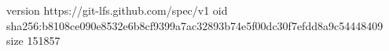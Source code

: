 version https://git-lfs.github.com/spec/v1
oid sha256:b8108ce090e8532e6b8cf9399a7ac32893b74e5f00dc30f7efdd8a9c54448409
size 151857
